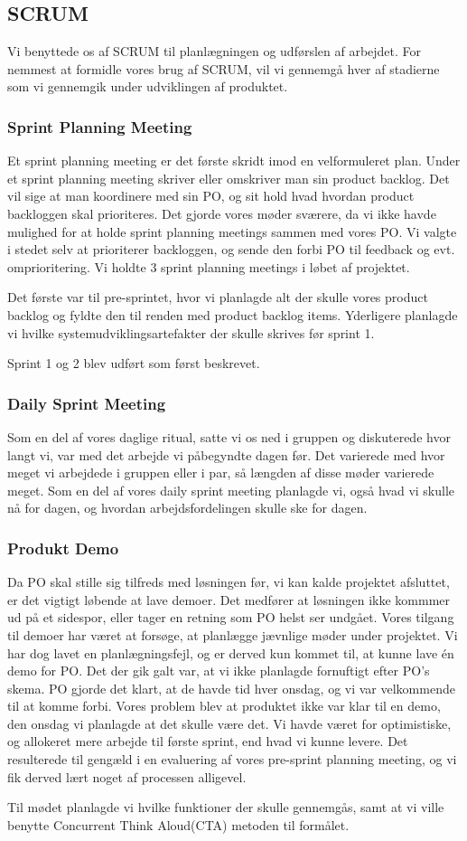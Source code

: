 \subsection{SCRUM}
Vi benyttede os af SCRUM til planlægningen og udførslen af arbejdet.
For nemmest at formidle vores brug af SCRUM, vil vi gennemgå hver af stadierne som vi gennemgik under udviklingen af produktet. 

\subsubsection{Sprint Planning Meeting}
Et sprint planning meeting er det første skridt imod en velformuleret plan.
 Under et sprint planning meeting skriver eller omskriver man sin product backlog.
  Det vil sige at man koordinere med sin PO, og sit hold hvad hvordan product backloggen skal prioriteres.
   Det gjorde vores møder sværere, da vi ikke havde mulighed for at holde sprint planning meetings sammen med vores PO.
    Vi valgte i stedet selv at prioriterer backloggen, og sende den forbi PO til feedback og evt. omprioritering.
     Vi holdte 3 sprint planning meetings i løbet af projektet. 

Det første var til pre-sprintet, hvor vi planlagde alt der skulle vores product backlog og fyldte den til renden med product backlog items.
 Yderligere planlagde vi hvilke systemudviklingsartefakter der skulle skrives før sprint 1.

Sprint 1 og 2 blev udført som først beskrevet.

\subsubsection{Daily Sprint Meeting}
Som en del af vores daglige ritual, satte vi os ned i gruppen og diskuterede hvor langt vi, var med det arbejde vi påbegyndte dagen før.
 Det varierede med hvor meget vi arbejdede i gruppen eller i par, så længden af disse møder varierede meget.
  Som en del af vores daily sprint meeting planlagde vi, også hvad vi skulle nå for dagen, og hvordan arbejdsfordelingen skulle ske for dagen.

\subsubsection{Produkt Demo}
Da PO skal stille sig tilfreds med løsningen før, vi kan kalde projektet afsluttet, er det vigtigt løbende at lave demoer.
 Det medfører at løsningen ikke kommmer ud på et sidespor, eller tager en retning som PO helst ser undgået.
 Vores tilgang til demoer har været at forsøge, at planlægge jævnlige møder under projektet. Vi har dog lavet en planlægningsfejl, og er derved kun kommet til, at kunne lave én demo for PO.
  Det der gik galt var, at vi ikke planlagde fornuftigt efter PO's skema.
   PO gjorde det klart, at de havde tid hver onsdag, og vi var velkommende til at komme forbi. 
   Vores problem blev at produktet ikke var klar til en demo, den onsdag vi planlagde at det skulle være det. Vi havde været for optimistiske, og allokeret mere arbejde til første sprint, end hvad vi kunne levere. Det resulterede til gengæld i en evaluering af vores pre-sprint planning meeting, og vi fik derved lært noget af processen alligevel.
   
   Til mødet planlagde vi hvilke funktioner der skulle gennemgås, samt at vi ville benytte Concurrent Think Aloud(CTA) metoden til formålet.